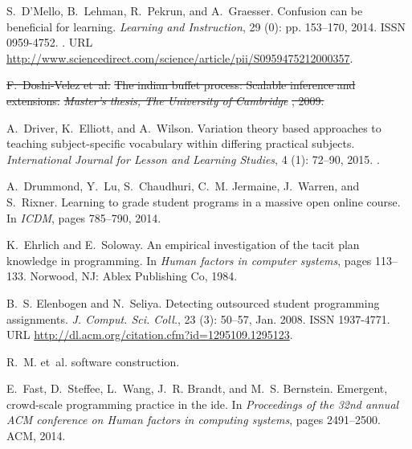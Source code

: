 \documentclass[12pt,twoside]{mitthesis}
\providecommand{\DIFdeltex}[1]{{\protect\color{red}\sout{#1}}}                      %
\providecommand{\DIFaddend}{} %
\providecommand{\DIFdelbegin}{} %
\providecommand{\DIFdelend}{} %
\providecommand{\DIFdel}[1]{\texorpdfstring{\DIFdeltex{#1}}{}} %
\begin{document}
\begin{thebibliography}{135}
\DIFaddend {}
S.~D'Mello, B.~Lehman, R.~Pekrun, and A.~Graesser.
\newblock Confusion can be beneficial for learning.
\newblock \emph{Learning and Instruction}, 29 (0): pp.
  153--170, 2014.
\newblock ISSN 0959-4752.
\newblock {}.
\newblock URL
  \url{http://www.sciencedirect.com/science/article/pii/S0959475212000357}.

\DIFdelbegin %
\DIFdel{F.~Doshi-Velez et~al.
}%
\DIFdel{The indian buffet process: Scalable inference and extensions.
}%
\emph{\DIFdel{Master's thesis, The University of Cambridge}}%
\DIFdel{, 2009.
}%

\DIFdelend {}
A.~Driver, K.~Elliott, and A.~Wilson.
\newblock Variation theory based approaches to teaching subject-specific
  vocabulary within differing practical subjects.
\newblock \emph{International Journal for Lesson and Learning Studies},
  4 (1): 72--90, 2015.
\newblock {}.

A.~Drummond, Y.~Lu, S.~Chaudhuri, C.~M. Jermaine, J.~Warren, and S.~Rixner.
\newblock Learning to grade student programs in a massive open online course.
\newblock In \emph{ICDM}, pages 785--790, 2014.

K.~Ehrlich and E.~Soloway.
\newblock An empirical investigation of the tacit plan knowledge in
  programming.
\newblock In \emph{Human factors in computer systems}, pages 113--133. Norwood,
  NJ: Ablex Publishing Co, 1984.

B.~S. Elenbogen and N.~Seliya.
\newblock Detecting outsourced student programming assignments.
\newblock \emph{J. Comput. Sci. Coll.}, 23 (3): 50--57, Jan.
  2008.
\newblock ISSN 1937-4771.
\newblock URL \url{http://dl.acm.org/citation.cfm?id=1295109.1295123}.

R.~M. et~al.
 software construction.

E.~Fast, D.~Steffee, L.~Wang, J.~R. Brandt, and M.~S. Bernstein.
\newblock Emergent, crowd-scale programming practice in the ide.
\newblock In \emph{Proceedings of the 32nd annual ACM conference on Human
  factors in computing systems}, pages 2491--2500. ACM, 2014.


\end{thebibliography}
\end{document}
